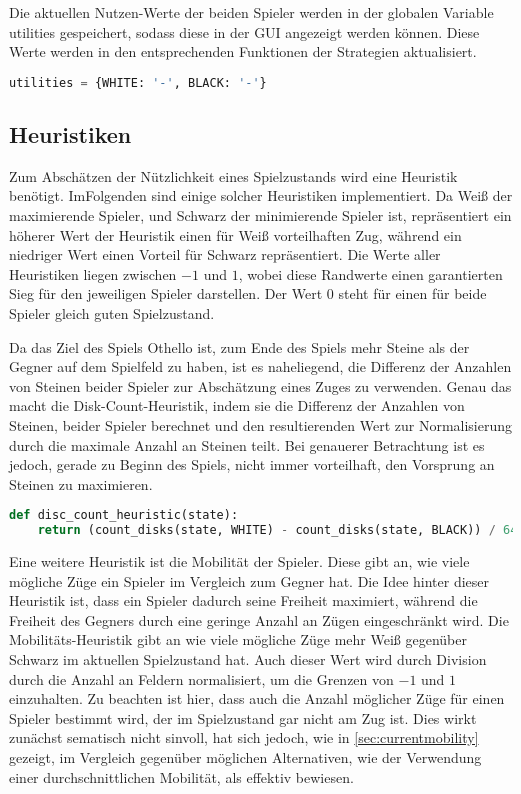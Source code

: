 Die aktuellen Nutzen-Werte der beiden Spieler werden in der globalen
Variable utilities gespeichert, sodass diese in der GUI angezeigt werden
können. Diese Werte werden in den entsprechenden Funktionen der
Strategien aktualisiert.

\begin{lstlisting}[language=Python]
utilities = {WHITE: '-', BLACK: '-'}
\end{lstlisting}

\hypertarget{heuristiken}{%
\subsection{Heuristiken}\label{heuristiken}}

Zum Abschätzen der Nützlichkeit eines Spielzustands wird eine Heuristik
benötigt. ImFolgenden sind einige solcher Heuristiken implementiert. Da
Weiß der maximierende Spieler, und Schwarz der minimierende Spieler ist,
repräsentiert ein höherer Wert der Heuristik einen für Weiß
vorteilhaften Zug, während ein niedriger Wert einen Vorteil für Schwarz
repräsentiert. Die Werte aller Heuristiken liegen zwischen \(-1\) und
\(1\), wobei diese Randwerte einen garantierten Sieg für den jeweiligen
Spieler darstellen. Der Wert \(0\) steht für einen für beide Spieler
gleich guten Spielzustand.

Da das Ziel des Spiels Othello ist, zum Ende des Spiels mehr Steine als
der Gegner auf dem Spielfeld zu haben, ist es naheliegend, die Differenz
der Anzahlen von Steinen beider Spieler zur Abschätzung eines Zuges zu
verwenden. Genau das macht die Disk-Count-Heuristik, indem sie die
Differenz der Anzahlen von Steinen, beider Spieler berechnet und den
resultierenden Wert zur Normalisierung durch die maximale Anzahl an
Steinen teilt. Bei genauerer Betrachtung ist es jedoch, gerade zu Beginn
des Spiels, nicht immer vorteilhaft, den Vorsprung an Steinen zu
maximieren.

\begin{lstlisting}[language=Python]
def disc_count_heuristic(state):
    return (count_disks(state, WHITE) - count_disks(state, BLACK)) / 64
\end{lstlisting}

Eine weitere Heuristik ist die Mobilität der Spieler. Diese gibt an, wie
viele mögliche Züge ein Spieler im Vergleich zum Gegner hat. Die Idee
hinter dieser Heuristik ist, dass ein Spieler dadurch seine Freiheit
maximiert, während die Freiheit des Gegners durch eine geringe Anzahl an
Zügen eingeschränkt wird. Die Mobilitäts-Heuristik gibt an wie viele
mögliche Züge mehr Weiß gegenüber Schwarz im aktuellen Spielzustand hat.
Auch dieser Wert wird durch Division durch die Anzahl an Feldern
normalisiert, um die Grenzen von \(-1\) und \(1\) einzuhalten. Zu
beachten ist hier, dass auch die Anzahl möglicher Züge für einen Spieler
bestimmt wird, der im Spielzustand gar nicht am Zug ist. Dies wirkt
zunächst sematisch nicht sinvoll, hat sich jedoch, wie in
\autoref{sec:currentmobility} gezeigt, im Vergleich gegenüber möglichen
Alternativen, wie der Verwendung einer durchschnittlichen Mobilität, als
effektiv bewiesen.

